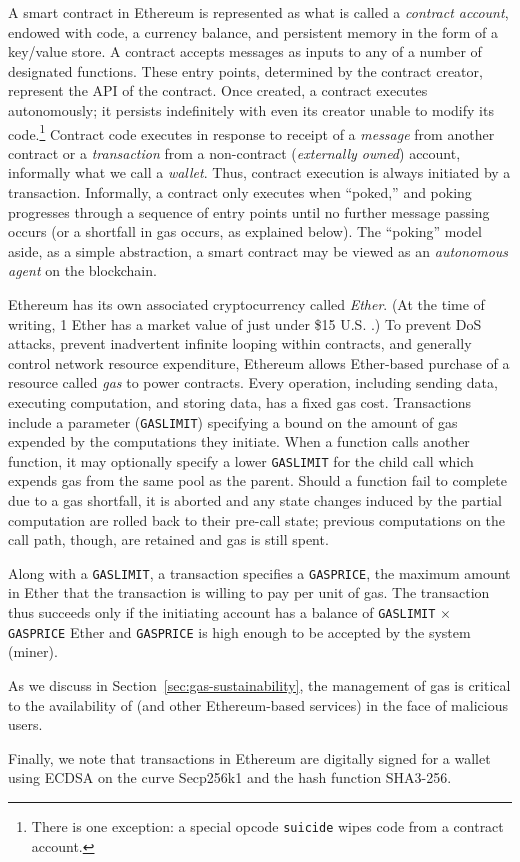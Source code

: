 A smart contract in Ethereum is represented as what is called a \emph{contract account}, endowed with code, a currency balance, and persistent memory in the form of a key/value store. A contract accepts messages as inputs to any of a number of designated functions. These entry points, determined by the contract creator, represent the API of the contract. Once created, a contract executes autonomously; it persists indefinitely with even its creator unable to modify its code.\footnote{There is one exception: a special opcode \texttt{suicide} wipes code from a contract account.} Contract code executes in response to receipt of a \emph{message} from another contract or a \emph{transaction} from a non-contract (\emph{externally owned}) account, informally what we call a \emph{wallet}. Thus, contract execution is always initiated by a transaction. Informally, a contract only executes when ``poked,'' and poking progresses through a sequence of entry points until no further message passing occurs (or a shortfall in gas occurs, as explained below). The ``poking'' model aside, as a simple abstraction, a smart contract may be viewed as an {\em autonomous agent} on the blockchain.

Ethereum has its own associated cryptocurrency called \emph{Ether}. (At the time of writing, 1 Ether has a market value of just under \$15 U.S. \cite{ethprice}.)
To prevent DoS attacks, prevent inadvertent infinite looping within contracts, and generally control network resource expenditure,
Ethereum allows Ether-based purchase of a resource called \emph{gas} to power contracts.
Every operation, including sending data, executing computation, and storing data, has a fixed gas cost.
Transactions include a parameter (\texttt{GASLIMIT}) specifying a bound on the amount of gas expended by the computations they initiate.
When a function calls another function, it may optionally specify a lower \texttt{GASLIMIT} for the child call which expends gas from the same pool as the parent.
Should a function fail to complete due to a gas shortfall,
it is aborted and any state changes induced by the partial computation are rolled back to their pre-call state;
previous computations on the call path, though, are retained and gas is still spent.

Along with a \texttt{GASLIMIT}, a transaction specifies a \texttt{GASPRICE}, the maximum amount in Ether that the transaction is willing to pay per unit of gas. The transaction thus succeeds only if the initiating account has a balance of \texttt{GASLIMIT} $\times$ \texttt{GASPRICE} Ether and \texttt{GASPRICE} is high enough to be accepted by the system (miner). 

As we discuss in Section~\ref{sec:gas-sustainability}, the management of gas is critical to the availability of \tc (and other Ethereum-based services) in the face of malicious users.

Finally, we note that transactions in Ethereum are digitally signed for a wallet using ECDSA on the curve Secp256k1 and the hash function SHA3-256.



